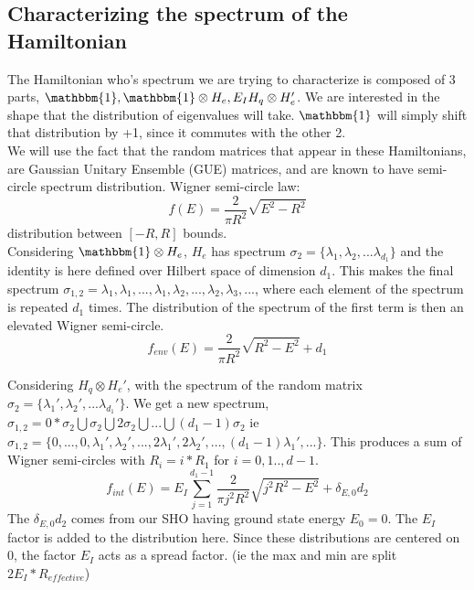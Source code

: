 \documentclass{article}
\begin{document}
\subsection{Characterizing the spectrum of the Hamiltonian}
The Hamiltonian who's spectrum we are trying to characterize is composed of 3 parts, $\mathbbm{1}, \mathbbm{1}\otimes H_e,E_IH_q\otimes H_e'$. We are interested in the shape that the distribution of eigenvalues will take. $\mathbbm{1}$ will simply shift that distribution by +1, since it commutes with the other 2. \\

We will use the fact that the random matrices that appear in these Hamiltonians, are Gaussian Unitary Ensemble (GUE) matrices, and are known to have semi-circle spectrum distribution.
Wigner semi-circle law:
\begin{equation}
    f(E)=\frac{2}{\pi R^2}\sqrt{E^2-R^2}
\end{equation}
distribution between $[-R,R]$ bounds.\\

Considering $\mathbbm{1}\otimes H_{e}$, $H_{e}$ has spectrum $\sigma_2=\{\lambda_1,\lambda_2,...\lambda_{d_1}\}$ and the identity is here defined over Hilbert space of dimension $d_1$. This makes  the final spectrum $\sigma_{1,2}={\lambda_1, \lambda_1, ..., \lambda_1, \lambda_2, ...,\lambda_2, \lambda_3, ...}$, where each element of the spectrum is repeated $d_1$ times. The distribution of the spectrum of the first term is then an elevated Wigner semi-circle.
\begin{equation}
    f_{env}(E) = \frac{2}{\pi R^2}\sqrt{R^2-E^2} + d_1
\end{equation}

Considering $H_q\otimes H_{e}'$, with the spectrum of the random matrix $\sigma_2=\{\lambda_1',\lambda_2',...\lambda_{d_1}'\}$. We get a new spectrum,  $\sigma_{1,2}=0*\sigma_2\bigcup\sigma_2\bigcup2\sigma_2\bigcup ...\bigcup(d_1-1)\sigma_2$ ie $\sigma_{1,2}= \{0,...,0,\lambda_1', \lambda_2', ..., 2\lambda_1', 2\lambda_2',..., (d_1-1)\lambda_1',...\}$. This produces a sum of Wigner semi-circles with $R_i=i*R_1$ for $i=0,1..,d-1$.
\begin{equation}
    f_{int}(E) = E_I\sum_{j=1}^{d_1-1}\frac{2}{\pi j^2R^2}\sqrt{j^2R^2-E^2} + \delta_{E,0}d_2
\end{equation}
The $\delta_{E,0}d_2$ comes from our SHO having ground state energy $E_0=0$. The $E_I$ factor is added to the distribution here. Since these distributions are centered on 0, the factor $E_I$ acts as a spread factor. (ie the max and min are split $2E_I*R_{effective}$)\\
\end{document}
